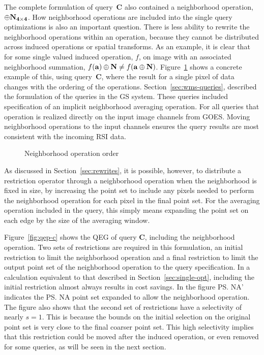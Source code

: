 \documentclass{ucdthesis}       %
\newcommand{\qry}[1]{{\bf #1}}
\begin{document}
The complete formulation of query~\qry{C} also contained a
neighborhood operation, $\oplus {\ensuremath{\bf{N_{4 \times 4}}}}$.  How
neighborhood operations are included into the single query
optimizations is also an important question.  There is less ability to
rewrite the neighborhood operations within an operation, because they
cannot be distributed across induced operations or spatial transforms.
As an example, it is clear that for some single valued induced
operation, $f$, on image  with an associated neighborhood
summation, $f({\bf{a}})\oplus {\ensuremath{\bf{N}}} \ne f({\bf{a}}\oplus{\ensuremath{\bf{N}}})$.
Figure~\ref{fig:neighbor-opt} shows a concrete example of this, using
query~\qry{C}, where the result for a single pixel of data changes
with the ordering of the operations.  Section~\ref{sec:wms-queries},
described the formulation of the queries in the \ac{GS} system.  These
queries included specification of an implicit neighborhood averaging
operation.  For all queries that operation is realized directly on the
input image channels from \ac{GOES}.  Moving neighborhood operations
to the input channels ensures the query results are most consistent
with the incoming \ac{RSI} data.

\begin{figure}[htb]
  \centering
  \scalebox{0.8}{}
 \caption{Neighborhood operation order}
 \label{fig:neighbor-opt}
\end{figure} 

As discussed in Section~\ref{sec:rewrites}, it is possible, however,
to distribute a restriction operator through a neighborhood operation
when the neighborhood is fixed in size, by increasing the point set to
include any pixels needed to perform the neighborhood operation for
each pixel in the final point set.  For the averaging operation
included in the query, this simply means expanding the point set on
each edge by the size of the averaging window.

Figure~\ref{fig:qep-c} shows the \ac{QEG} of query \qry{C}, including
the neighborhood operation.  Two sets of restrictions are required in
this formulation, an initial restriction to limit the neighborhood
operation and a final restriction to limit the output point set of the
neighborhood operation to the query specification.  In a calculation
equivalent to that described in Section~\ref{sec:single-opt},
including the initial restriction almost always results in cost
savings.  In the figure \ps{NA'} indicates the \ps{NA} point set
expanded to allow the neighborhood operation.  The figure also shows
that the second set of restrictions have a selectivity of nearly $s=1$.
This is because the bounds on the initial selection on the original
point set is very close to the final coarser point set.  This high
selectivity implies that this restriction could be moved after the induced
operation, or even removed for some queries, as will be seen in the
next section.
\end{document}
